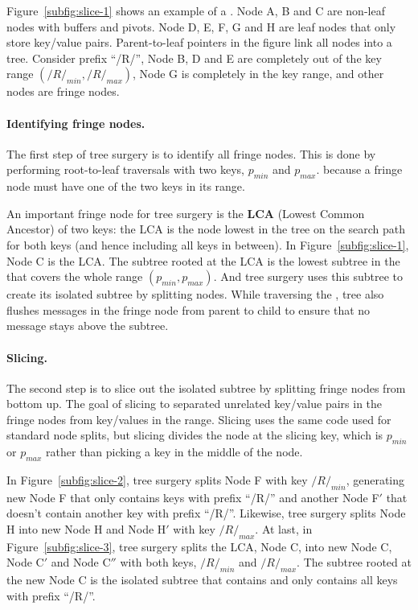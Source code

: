 Figure~\ref{subfig:slice-1} shows an example of a \bet.
Node A, B and C are non-leaf nodes with buffers and pivots.
Node D, E, F, G and H are leaf nodes that only store key/value pairs.
Parent-to-leaf pointers in the figure link all nodes into a tree.
Consider prefix ``/R/'',
Node B, D and E are completely out of the key range $(/R/_{min}, /R/_{max})$,
Node G is completely in the key range, and other nodes are fringe nodes.

\paragraph{Identifying fringe nodes.}
The first step of tree surgery is to identify all fringe nodes.
This is done by performing root-to-leaf traversals with two keys,
$p_{min}$ and $p_{max}$.
because a fringe node must have one of the two keys in its range.

An important fringe node for tree surgery is the \textbf{LCA}
(Lowest Common Ancestor) of two keys: the LCA is the \bet node lowest in the
tree on the search path for both keys (and hence including all keys in between).
In Figure~\ref{subfig:slice-1}, Node C is the LCA.
The subtree rooted at the LCA is the lowest subtree in the \bet that covers
the whole range $(p_{min}, p_{max})$.
And tree surgery uses this subtree to create its isolated subtree by splitting
nodes.
While traversing the \bet, tree also flushes messages in the fringe node from
parent to child to ensure that no message stays above the subtree.

\paragraph{Slicing.}
The second step is to slice out the isolated subtree by splitting fringe nodes
from bottom up.
The goal of slicing to separated unrelated key/value pairs in the fringe nodes
from key/values in the range.
Slicing uses the same code used for standard \bet node splits, but slicing
divides the node at the slicing key, which is $p_{min}$ or $p_{max}$ rather than
picking a key in the middle of the node.

In Figure~\ref{subfig:slice-2}, tree surgery splits Node F with key
$/R/_{min}$, generating new Node F that only contains keys with prefix
``/R/'' and another Node F$'$ that doesn't contain another key with prefix
``/R/''.
Likewise, tree surgery splits Node H into new Node H and Node H$'$ with key
$/R/_{max}$.
At last, in Figure~\ref{subfig:slice-3}, tree surgery splits the LCA, Node C,
into new Node C, Node C$'$ and Node C$''$ with both keys, $/R/_{min}$ and
$/R/_{max}$.
The subtree rooted at the new Node C is the isolated subtree that contains and
only contains all keys with prefix ``/R/''.


